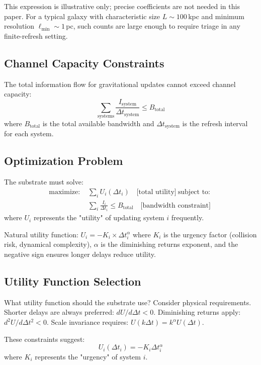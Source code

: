 \documentclass[usenatbib]{mnras}
\begin{document}
This expression is illustrative only; precise coefficients are not needed in this paper. For a typical galaxy with characteristic size $L \sim 100$\,kpc and minimum resolution $\ell_{\text{min}} \sim 1$\,pc, such counts are large enough to require triage in any finite-refresh setting.

\subsection{Channel Capacity Constraints}

The total information flow for gravitational updates cannot exceed channel capacity:
\begin{equation}
\sum_{\text{systems}} \frac{I_{\text{system}}}{\Delta t_{\text{system}}} \leq B_{\text{total}}
\end{equation}
where $B_{\text{total}}$ is the total available bandwidth and $\Delta t_{\text{system}}$ is the refresh interval for each system.

\subsection{Optimization Problem}

The substrate must solve:
\begin{align}
\text{maximize: } & \sum_i U_i(\Delta t_i) \quad \text{[total utility]} \
\text{subject to: }\\ & \sum_i \frac{I_i}{\Delta t_i} \leq B_{\text{total}} \quad \text{[bandwidth constraint]}
\end{align}
where $U_i$ represents the "utility" of updating system $i$ frequently.

Natural utility function: $U_i = -K_i \times \Delta t_i^\alpha$ where $K_i$ is the urgency factor (collision risk, dynamical complexity), $\alpha$ is the diminishing returns exponent, and the negative sign ensures longer delays reduce utility.

\subsection{Utility Function Selection}

What utility function should the substrate use? Consider physical requirements. Shorter delays are always preferred: $dU/d\Delta t < 0$. Diminishing returns apply: $d^2U/d\Delta t^2 < 0$. Scale invariance requires: $U(k\Delta t) = k^\alpha U(\Delta t)$.

These constraints suggest:
\begin{equation}
U_i(\Delta t_i) = -K_i \Delta t_i^\alpha
\end{equation}
where $K_i$ represents the "urgency" of system $i$.
\end{document}

